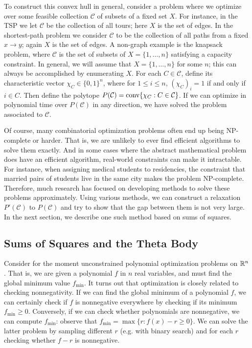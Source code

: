 To construct this convex hull in general, consider a problem where we optimize over some feasible collection $\mathcal{C}$ of subsets of a fixed set $X$.
For instance, in the TSP we let $\mathcal{C}$ be the collection of all tours; here $X$ is the set of edges.
In the shortest-path problem we consider $\mathcal{C}$ to be the collection of all paths from a fixed $x \to y$; again $X$ is the set of edges.
A non-graph example is the knapsack problem, where $\mathcal{C}$ is the set of subsets of $X = \{1, \ldots, n\}$ satisfying a capacity constraint.
In general, we will assume that $X = \{1, \ldots, n\}$ for some $n$; this can always be accomplished by enumerating $X$.
For each $C \in \mathcal{C}$, define its characteristic vector $\chi_C \in \{0,1\}^n$, where for $1 \le i \le n$, $(\chi_C)_i = 1$ if and only if $i \in C$.
Then define the polytope $P(\mathcal{C}) = \hbox{conv} \{\chi_C: C \in \mathcal{C}\}$.
If we can optimize in polynomial time over $P(\mathcal{C})$ in any direction, we have solved the problem associated to $\mathcal{C}$.

Of course, many combinatorial optimization problems often end up being NP-complete or harder. 
That is, we are unlikely to ever find efficient algorithms to solve them exactly.
And in some cases where the abstract mathematical problem does have an efficient algorithm, real-world constraints can make it intractable. 
For instance, when assigning medical students to residencies, the constraint that married pairs of students live in the same city makes the problem NP-complete.
Therefore, much research has focused on developing methods to solve these problems approximately. 
Using various methods, we can construct a relaxation $P'(\mathcal{C})$ to $ P(\mathcal{C})$ and try to show that the gap between them is not very large.
In the next section, we describe one such method based on sums of squares.

\subsection{Sums of Squares and the Theta Body}
Consider for the moment unconstrained polynomial optimization problems on $\mathbb{R}^n$. 
That  is, we are given a polynomial $f$ in $n$ real variables, and must find the global minimum value $f_{\min}$. 
It turns out that optimization is closely related to checking nonnegativity.
If we can find the global minimum of a polynomial $f$, we can certainly check if $f$ is nonnegative everywhere by checking if its minimum $f_{\min} \ge 0$.
Conversely, if we can check whether polynomials are nonnegative, we can compute $f_{\min}$: observe that $f_{\min} = \max \{r: f(x) - r \ge 0\}$. 
We can solve the latter problem by sampling different $r$ (e.g. with binary search) and for each $r$ checking whether $f - r$ is nonnegative.

